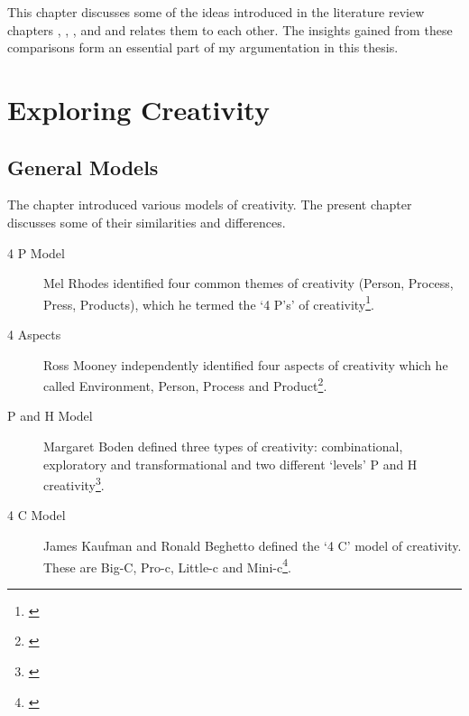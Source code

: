 
This chapter discusses some of the ideas introduced in the literature review chapters , , , and  and relates them to each other. The insights gained from these comparisons form an essential part of my argumentation in this thesis.


\section{Exploring Creativity}



\subsection{General Models}
\label{s:models}

The  chapter introduced various models of creativity. The present chapter discusses some of their similarities and differences.

\begin{description}
  \item [4 P Model] Mel Rhodes identified four common themes of creativity (Person, Process, Press, Products), which he termed the `4 P\rq s' of creativity\footnote{\autocite{Rhodes1961}}.
  \item [4 Aspects] Ross Mooney independently identified four aspects of creativity which he called Environment, Person, Process and Product\footnote{\autocite[as cited in][]{Sternberg1999}}.
  \item [P and H Model] Margaret Boden defined three types of creativity: combinational, exploratory and transformational and two different `levels' P and H creativity\footnote{\autocite{Boden2003}}.
  \item [4 C Model] James Kaufman and Ronald Beghetto defined the `4 C' model of creativity. These are Big-C, Pro-c, Little-c and Mini-c\footnote{\autocite{Kaufman2009}}.
\end{description}

